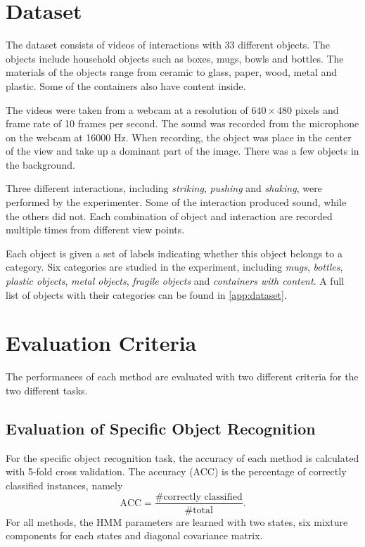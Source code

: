 \documentclass[12pt,final,twoside]{report}
\begin{document}
\section{Dataset}
The dataset consists of videos of interactions with 33 different objects. The objects include household objects such as boxes, mugs, bowls and bottles. The materials of the objects range from ceramic to glass, paper, wood, metal and plastic. Some of the containers also have content inside.

The videos were taken from a webcam at a resolution of $640 \times 480$ pixels and frame rate of 10 frames per second. The sound was recorded from the microphone on the webcam at 16000 Hz. When recording, the object was place in the center of the view and take up a dominant part of the image. There was a few objects in the background.

Three different interactions, including \emph{striking}, \emph{pushing} and \emph{shaking}, were performed by the experimenter. Some of the interaction produced sound, while the others did not. Each combination of object and interaction are recorded multiple times from different view points.

Each object is given a set of labels indicating whether this object belongs to a category. Six categories are studied in the experiment, including \emph{mugs}, \emph{bottles}, \emph{plastic objects}, \emph{metal objects}, \emph{fragile objects} and \emph{containers with content}.  
A full list of objects with their categories can be found in \cref{app:dataset}. 

\section{Evaluation Criteria}
The performances of each method are evaluated with two different criteria for the two different tasks. 

\subsection{Evaluation of Specific Object Recognition}
For the specific object recognition task, the accuracy of each method is calculated with 5-fold cross validation. The accuracy (ACC) is the percentage of correctly classified instances, namely 
\[ \text{ACC} =  \frac{\text{\# correctly classified}}{\text{\# total}} . \]
For all methods, the HMM parameters are learned with two states, six mixture components for each states and diagonal covariance matrix.
\end{document}
